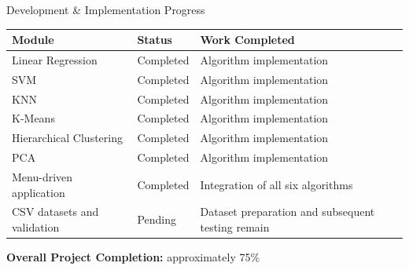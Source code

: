 \documentclass[aspectratio=169,11pt]{beamer}
\begin{document}
\begin{frame}[shrink=15]{Development \& Implementation Progress}
\scriptsize
\begin{center}
\renewcommand{\arraystretch}{1.3}
\begin{tabularx}{.96\textwidth}{@{}p{3.6cm}p{1.8cm}X@{}}
\toprule
\textbf{Module} & \textbf{Status} & \textbf{Work Completed}\\
\midrule
Linear Regression & Completed & Algorithm
implementation\\ 
SVM &	Completed	& Algorithm implementation\\
KNN	&Completed	&Algorithm implementation\\
K-Means	&Completed	&Algorithm implementation\\
Hierarchical Clustering&	Completed	&Algorithm implementation \\
PCA	&Completed	&Algorithm implementation\\
Menu-driven application&	Completed&	Integration of all six algorithms\\
CSV datasets and validation	&Pending	&Dataset preparation and subsequent testing remain\\
\bottomrule
\end{tabularx}
\end{center}

\vspace{3mm}
\begin{center}
\colorbox{GEULightBlue}{\parbox{.65\textwidth}{\centering
\textbf{Overall Project Completion:} approximately 75\%}}
\end{center}
\end{frame}
\end{document}
